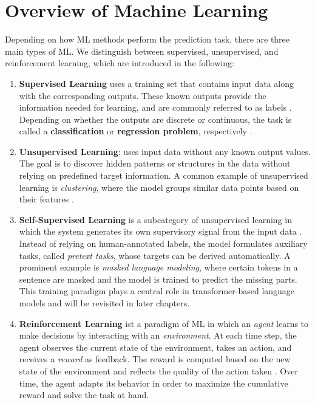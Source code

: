 \section{Overview of Machine Learning}\label{OML}
Depending on how \ac{ML} methods perform the prediction task, there are three main types of \ac{ML}. 
We distinguish between supervised, unsupervised, and reinforcement learning, which are introduced in the following:
\begin{enumerate}
    \item \textbf{Supervised Learning} uses a training set that contains input data along with the corresponding outputs.
    These known outputs provide the information needed for learning, and are commonly referred to as labels \cite{MachLearnFoundation}.
    Depending on whether the outputs are discrete or continuous, the task is called a \textbf{classification} or \textbf{regression problem}, respectively \cite{zhou_machine_2021}.
    \item \textbf{Unsupervised Learning}: uses input data without any known output values.
    The goal is to discover hidden patterns or structures in the data without relying on predefined target information.
    A common example of unsupervised learning is \textit{clustering}, where the model groups similar data points based on their features \cite{DataMining}.
    \item \textbf{Self-Supervised Learning} is a subcategory of unsupervised learning in which the system generates its own supervisory signal from the input data \cite{jing_self_supervised_2021}.
    Instead of relying on human-annotated labels, the model formulates auxiliary tasks, called \emph{pretext tasks}, whose targets can be derived automatically.
    A prominent example is \emph{masked language modeling}, where certain tokens in a sentence are masked and the model is trained to predict the missing parts.
    This training paradigm plays a central role in transformer-based language models and will be revisited in later chapters.


    \item \textbf{Reinforcement Learning} ist a paradigm of \ac{ML} in which an \textit{agent} learns to make decisions by interacting with an \textit{environment}.  
    At each time step, the agent observes the current state of the environment, takes an action, and receives a \textit{reward} as feedback.  
    The reward is computed based on the new state of the environment and reflects the quality of the action taken \cite{zhou_machine_2021, ReInfLearning}.  
    Over time, the agent adapts its behavior in order to maximize the cumulative reward and solve the task at hand.


\end{enumerate}
